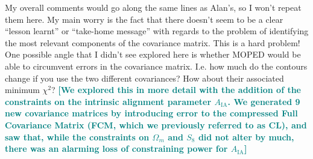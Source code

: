 \documentclass{article}
\newcommand\reply[1]{{\bf {\textcolor{teal}{[#1]}}}}
\begin{document}
	My overall comments would go along the same lines as Alan's, so I won't repeat them here. My main worry is the fact that there doesn't seem to be a clear “lesson learnt” or “take-home message” with regards to the problem of identifying the most relevant components of the covariance matrix. This is a hard problem! One possible angle that I didn't see explored here is whether MOPED would be able to circumvent errors in the covariance matrix. I.e. how much do the contours change if you use the two different covariances? How about their associated minimum $\chi^2$? \reply{We explored this in more detail with the addition of the constraints on the intrinsic alignment parameter $A_{\mathrm{IA}}$. We generated 9 new covariance matrices by introducing error to the compressed Full Covariance Matrix (FCM, which we previously referred to as CL), and saw that, while the constraints on $\Omega_m$ and $S_8$ did not alter by much, there was an alarming loss of constraining power for $A_{\mathrm{IA}}$}
	
\end{document}
